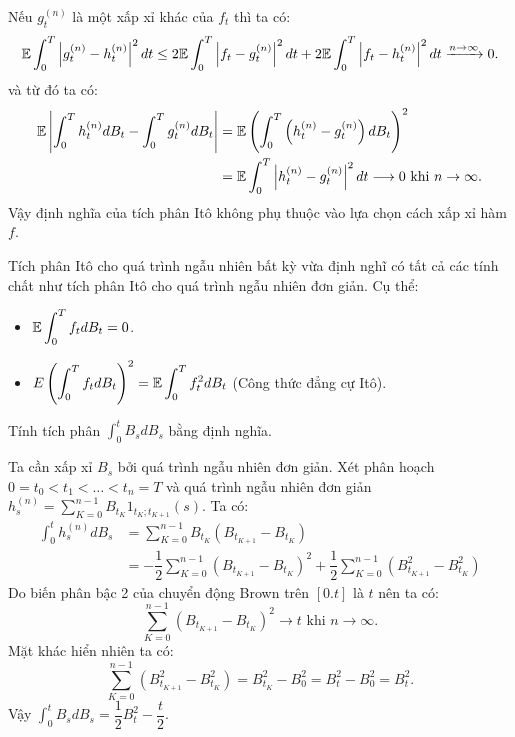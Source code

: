 \begin{comment*}
Nếu $g_t^{(n)}$ là một xấp xỉ khác của $f_t$ thì ta có:
\[\E \displaystyle \int_0^T \left|g_t^{(n)}-h_t^{(n)}\right|^2 dt \leq 2\E \displaystyle \int_0^T \left|f_t-g_t^{(n)}\right|^2 dt + 2\E \displaystyle \int_0^T \left|f_t-h_t^{(n)}\right|^2 dt \xrightarrow[]{n\to \infty} 0.\]
và từ đó ta có:
\begin{align*}
    \E \left|\displaystyle \int_0^T h_t^{(n)} dB_t - \displaystyle \int_0^T g_t^{(n)} dB_t \right| &= \E \left(\displaystyle \int_0^T \left(h_t^{(n)}- g_t^{(n)} \right) dB_t \right)^2\\
    &= \E \displaystyle \int_0^T \left|h_t^{(n)}- g_t^{(n)}\right|^2 dt \longrightarrow 0 \text{ khi } n \to \infty.
\end{align*}
Vậy định nghĩa của tích phân Itô không phụ thuộc vào lựa chọn cách xấp xỉ hàm $f$.
\end{comment*}
\begin{remark*}
Tích phân Itô cho quá trình ngẫu nhiên bất kỳ vừa định nghĩ có tất cả các tính chất như tích phân Itô cho quá trình ngẫu nhiên đơn giản. Cụ thể:
\begin{itemize}
    \item $\mathbb{E} \displaystyle \int_0^T f_t dB_t = 0$.
    \item $E \left(\displaystyle \int_0^T f_t dB_t \right)^2 = \mathbb{E} \displaystyle \int_0^T f_t^2 dB_t$ (Công thức đẳng cự Itô).
\end{itemize}
\end{remark*}
\begin{exam*}
Tính tích phân $\displaystyle \int_0^t B_s dB_s$ bằng định nghĩa.
\begin{sol*}
    Ta cần xấp xỉ $B_s$ bởi quá trình ngẫu nhiên đơn giản. Xét phân hoạch $0 = t_0 < t_1 < \dots < t_n = T$ và quá trình ngẫu nhiên đơn giản $h_s^{(n)} = \sum\limits_{K=0}^{n-1}B_{t_K}1_{t_K;t_{K+1}}(s)$. Ta có:
    \begin{align*}
        \displaystyle \int_0^t h_s^{(n)} dB_s &= \sum\limits_{K=0}^{n-1}B_{t_K}(B_{t_{K+1}}-B_{t_K})\\
        &= -\dfrac{1}{2}\sum\limits_{K=0}^{n-1}(B_{t_{K+1}}-B_{t_K})^2 +\dfrac{1}{2}\sum\limits_{K=0}^{n-1}(B_{t_{K+1}}^2-B_{t_K}^2)
    \end{align*}
    Do biến phân bậc 2 của chuyển động Brown trên $[0.t]$ là $t$ nên ta có:
    \[\sum\limits_{K=0}^{n-1}(B_{t_{K+1}}-B_{t_K})^2 \longrightarrow t \text{ khi } n \to \infty.\]
    Mặt khác hiển nhiên ta có: 
    \[\sum\limits_{K=0}^{n-1}(B_{t_{K+1}}^2-B_{t_K}^2) = B_{t_K}^2-B_0^2 = B_t^2-B_0^2 = B_t^2.\]
    Vậy $\displaystyle \int_0^t B_s dB_s = \dfrac{1}{2}B_t^2 - \dfrac{t}{2}$.
\end{sol*}
\end{exam*}
